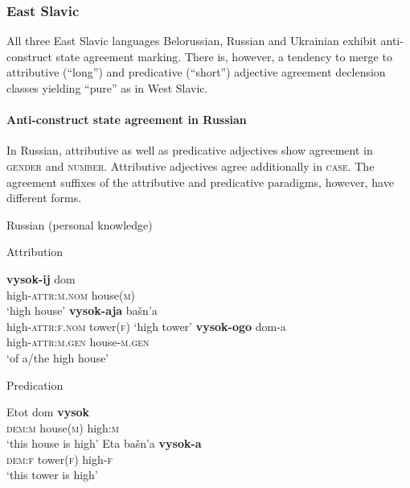 \subsubsection{East Slavic}
All three East Slavic languages Belorussian, Russian and Ukrainian exhibit anti\hyp{}construct state agreement marking. There is, however, a tendency to merge to attributive (“long”) and predicative (“short”) adjective agreement declension classes yielding “pure”  as in West Slavic.

\paragraph*{Anti\hyp{}construct state agreement in Russian} \label{russian synchr}
In Russian, attributive as well as predicative adjectives show agreement in \textsc{gender} and \textsc{number}. Attributive adjectives agree additionally in \textsc{case}. The agreement suffixes of the attributive and predicative paradigms, however, have different forms.
\begin{exe}
\label{ru agr}
\ex \rm{Russian (personal knowledge)}
\begin{xlist}
\label{ru attr}
\ex \rm{Attribution}
\begin{xlist}
\ex
\gll 	\textbf{vysok-ij} 		dom\\
	high-\textsc{attr:m.nom} house(\textsc{m})\\
\glt	 ‘high house’
\ex \textbf{vysok-aja}	bašn'a\\
	high-\textsc{attr:f.nom} 	tower(\textsc{f})
\glt	‘high tower’
\ex	
\gll	\textbf{vysok-ogo}	dom-a\\
	high-\textsc{attr:m.gen}	house-\textsc{m.gen}\\
\glt	‘of a/the high house’
\end{xlist}
\ex \rm{Predication}
\begin{xlist}
\ex
\gll 	Etot 	dom	\textbf{vysok}\\
	\textsc{dem:m} house(\textsc{m}) 	high:\textsc{m}\\
\glt	 ‘this house is high’
\ex	
\gll	Eta 	bašn'a	\textbf{vysok-a}\\
	\textsc{dem:f} tower(\textsc{f}) 	high-\textsc{f}\\
\glt	‘this tower is high’
\end{xlist}
\end{xlist}
\end{exe}
